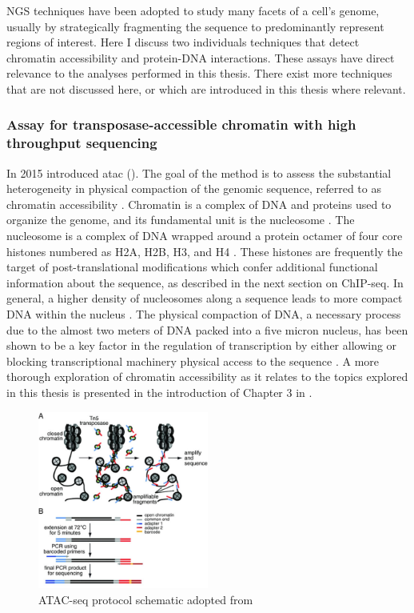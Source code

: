 NGS techniques have been adopted to study many facets of a cell's genome, usually by strategically fragmenting the sequence to predominantly represent regions of interest. Here I discuss two individuals techniques that detect chromatin accessibility and protein-DNA interactions.  These assays have direct relevance to the analyses performed in this thesis. There exist more techniques that are not discussed here, or which are introduced in this thesis where relevant. 

\subsubsection{Assay for transposase-accessible chromatin with high throughput sequencing} \label{intro:atac}

In 2015 \textcite{Buenrostro2015a} introduced \gls{atac} (). The goal of the method is to assess the substantial heterogeneity in physical compaction of the genomic sequence, referred to as chromatin accessibility \cite{Thurman2012a}. Chromatin is a complex of DNA and proteins used to organize the genome, and its fundamental unit is the nucleosome \cite{Bell2011a}. The nucleosome is a complex of DNA wrapped around a protein octamer of four core histones numbered as H2A, H2B, H3, and H4 \cite{Bell2011a}. These histones are frequently the target of post-translational modifications which confer additional functional information about the sequence, as described in the next section on ChIP-seq. In general, a higher density of nucleosomes along a sequence leads to more compact DNA within the nucleus \cite{Kornberg1974}.  
The physical compaction of DNA, a necessary process due to the almost two meters of DNA packed into a five micron nucleus, has been shown to be a key factor in the regulation of transcription by either allowing or blocking transcriptional machinery physical access to the sequence \cite{Bell2011,Gross2003}. A more thorough exploration of chromatin accessibility as it relates to the topics explored in this thesis is presented in the introduction of Chapter 3 in . 

\begin{figure}
    \centering
    \includegraphics[width=0.5\textwidth]{plot/ch1/atac.jpg}
    \caption{ATAC-seq protocol schematic adopted from \cite{Buenrostro2015a}}
    \label{fig:atac}
\end{figure}

